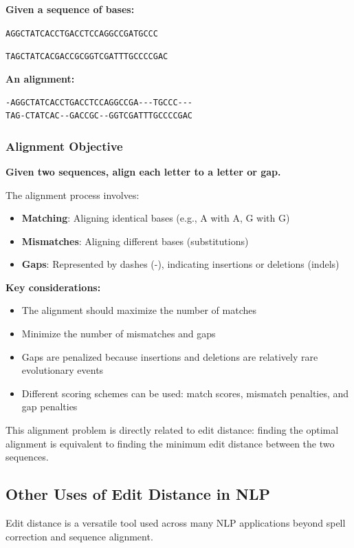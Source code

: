 \documentclass[11pt,a4paper]{article}
\theoremstyle{definition}
\theoremstyle{plain}
\theoremstyle{remark}
\begin{document}
\textbf{Given a sequence of bases:}

\texttt{AGGCTATCACCTGACCTCCAGGCCGATGCCC}

\texttt{TAGCTATCACGACCGCGGTCGATTTGCCCCGAC}

\textbf{An alignment:}

\begin{verbatim}
-AGGCTATCACCTGACCTCCAGGCCGA---TGCCC---
TAG-CTATCAC--GACCGC--GGTCGATTTGCCCCGAC
\end{verbatim}

\subsubsection{Alignment Objective}

\textbf{Given two sequences, align each letter to a letter or gap.}

The alignment process involves:
\begin{itemize}
    \item \textbf{Matching}: Aligning identical bases (e.g., A with A, G with G)
    \item \textbf{Mismatches}: Aligning different bases (substitutions)
    \item \textbf{Gaps}: Represented by dashes (-), indicating insertions or deletions (indels)
\end{itemize}

\textbf{Key considerations:}
\begin{itemize}
    \item The alignment should maximize the number of matches
    \item Minimize the number of mismatches and gaps
    \item Gaps are penalized because insertions and deletions are relatively rare evolutionary events
    \item Different scoring schemes can be used: match scores, mismatch penalties, and gap penalties
\end{itemize}

This alignment problem is directly related to edit distance: finding the optimal alignment is equivalent to finding the minimum edit distance between the two sequences.

\subsection{Other Uses of Edit Distance in NLP}

Edit distance is a versatile tool used across many NLP applications beyond spell correction and sequence alignment.
\end{document}
